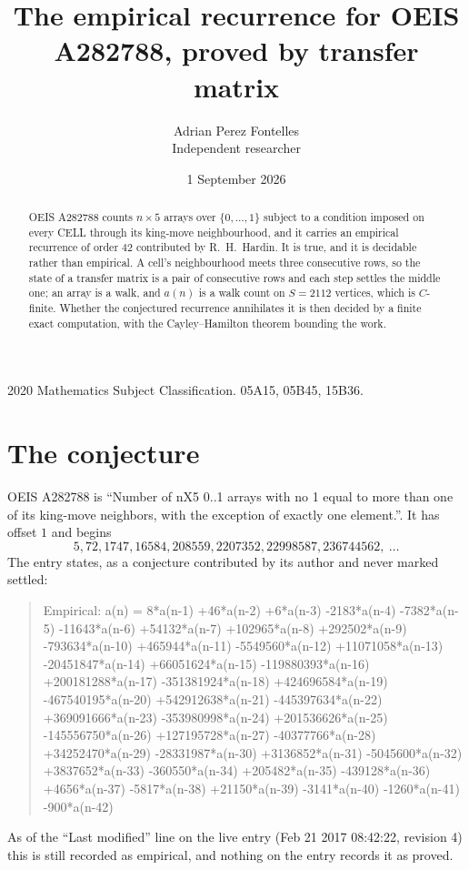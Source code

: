 \documentclass[11pt,a4paper]{article}
\title{The empirical recurrence for OEIS A282788, proved by transfer matrix}
\author{Adrian Perez Fontelles\\ \small Independent researcher}
\date{1 September 2026}
\theoremstyle{plain}
\theoremstyle{definition}
\begin{document}
\maketitle

\begin{abstract}
OEIS A282788 counts $n\times5$ arrays over $\{0,\dots,1\}$ subject to a condition imposed on
every CELL through its king-move neighbourhood, and it carries an empirical recurrence of
order $42$ contributed by R.~H.~Hardin. It is true, and it is decidable rather than
empirical. A cell's neighbourhood meets three consecutive rows, so the state of a transfer
matrix is a pair of consecutive rows and each step settles the middle one; an array is a
walk, and $a(n)$ is a walk count on $S=2112$ vertices, which is $C$-finite. Whether the
conjectured recurrence annihilates it is then decided by a finite exact computation, with the
Cayley--Hamilton theorem bounding the work.
\end{abstract}

\noindent\small 2020 Mathematics Subject Classification. 05A15, 05B45, 15B36.\normalsize

\section{The conjecture}

OEIS A282788 is ``Number of nX5 0..1 arrays with no 1 equal to more than one of its king-move neighbors, with the exception of exactly one element.''. It has offset $1$ and begins
\[
5, 72, 1747, 16584, 208559, 2207352, 22998587, 236744562,\ \dots
\]
The entry states, as a conjecture contributed by its author and never marked settled:
\begin{quote}
Empirical: a(n) = 8*a(n-1) +46*a(n-2) +6*a(n-3) -2183*a(n-4) -7382*a(n-5) -11643*a(n-6) +54132*a(n-7) +102965*a(n-8) +292502*a(n-9) -793634*a(n-10) +465944*a(n-11) -5549560*a(n-12) +11071058*a(n-13) -20451847*a(n-14) +66051624*a(n-15) -119880393*a(n-16) +200181288*a(n-17) -351381924*a(n-18) +424696584*a(n-19) -467540195*a(n-20) +542912638*a(n-21) -445397634*a(n-22) +369091666*a(n-23) -353980998*a(n-24) +201536626*a(n-25) -145556750*a(n-26) +127195728*a(n-27) -40377766*a(n-28) +34252470*a(n-29) -28331987*a(n-30) +3136852*a(n-31) -5045600*a(n-32) +3837652*a(n-33) -360550*a(n-34) +205482*a(n-35) -439128*a(n-36) +4656*a(n-37) -5817*a(n-38) +21150*a(n-39) -3141*a(n-40) -1260*a(n-41) -900*a(n-42)
\end{quote}
As of the ``Last modified'' line on the live entry (Feb 21 2017 08:42:22, revision 4) this is still
recorded as empirical, and nothing on the entry records it as proved.
\end{document}
